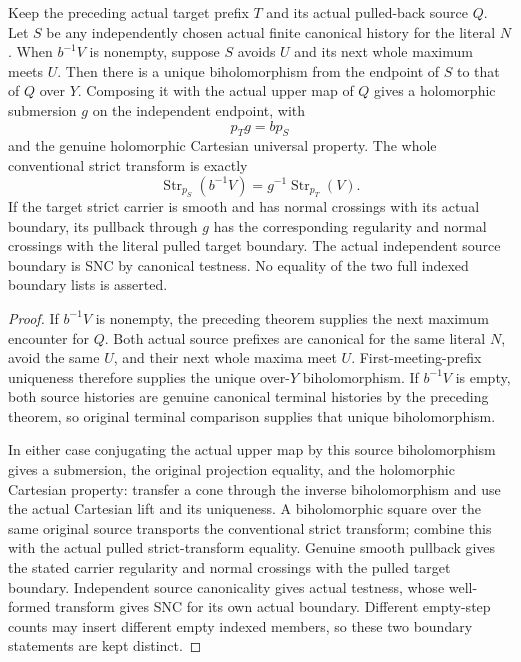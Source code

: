 \begin{theorem}
\label{hir:original-independent-source-stopped-cartesian-comparison}
\leanok
Keep the preceding actual target prefix $T$ and its actual pulled-back
source $Q$.  Let $S$ be any independently chosen actual finite canonical
history for the literal $N$.  When $b^{-1}V$ is nonempty, suppose $S$
avoids $U$ and its next whole maximum meets $U$.  Then there is a unique
biholomorphism from the endpoint of $S$ to that of $Q$ over $Y$.
Composing it with the actual upper map of $Q$ gives a holomorphic
submersion $g$ on the independent endpoint, with
\[
 p_T g=b p_S
\]
and the genuine holomorphic Cartesian universal property.  The whole
conventional strict transform is exactly
\[
 \operatorname{Str}_{p_S}(b^{-1}V)
       =g^{-1}\operatorname{Str}_{p_T}(V).
\]
If the target strict carrier is smooth and has normal crossings with
its actual boundary, its pullback through $g$ has the corresponding
regularity and normal crossings with the literal pulled target boundary.
The actual independent source boundary is SNC by canonical testness.
No equality of the two full indexed boundary lists is asserted.
\end{theorem}
\begin{proof}
If $b^{-1}V$ is nonempty, the preceding theorem supplies the next maximum
encounter for $Q$.  Both actual source prefixes are canonical for the
same literal $N$, avoid the same $U$, and their next whole maxima meet
$U$.  First-meeting-prefix uniqueness therefore supplies the unique
over-$Y$ biholomorphism.  If $b^{-1}V$ is empty, both source histories are
genuine canonical terminal histories by the preceding theorem, so
original terminal comparison supplies that unique biholomorphism.

In either case conjugating the actual upper map by this source
biholomorphism gives a submersion, the original projection equality, and
the holomorphic Cartesian property: transfer a cone through the inverse
biholomorphism and use the actual Cartesian lift and its uniqueness.
A biholomorphic square over the same original source transports the
conventional strict transform; combine this with the actual pulled
strict-transform equality.  Genuine smooth pullback gives the stated
carrier regularity and normal crossings with the pulled target
boundary.  Independent source canonicality gives actual testness, whose
well-formed transform gives SNC for its own actual boundary.  Different
empty-step counts may insert different empty indexed members, so these
two boundary statements are kept distinct.
\end{proof}

